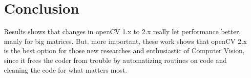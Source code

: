 \section{Conclusion}\label{sec:5}
Results shows that changes in openCV 1.x to 2.x really let performance better, manly for big matrices. But, more important, these work shows that openCV 2.x is the best option for those new researches and enthusiastic of Computer Vision, since it frees the coder from trouble by automatizing routines on code and cleaning the code for what matters most. 